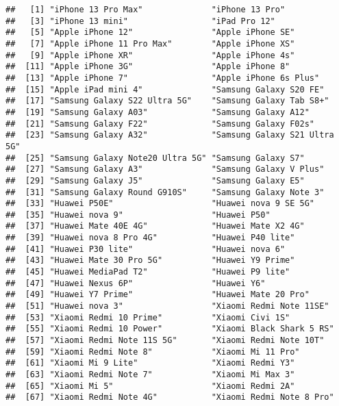 \documentclass[
]{article}
\begin{document}
\begin{verbatim}
##   [1] "iPhone 13 Pro Max"              "iPhone 13 Pro"                 
##   [3] "iPhone 13 mini"                 "iPad Pro 12"                   
##   [5] "Apple iPhone 12"                "Apple iPhone SE"               
##   [7] "Apple iPhone 11 Pro Max"        "Apple iPhone XS"               
##   [9] "Apple iPhone XR"                "Apple iPhone 4s"               
##  [11] "Apple iPhone 3G"                "Apple iPhone 8"                
##  [13] "Apple iPhone 7"                 "Apple iPhone 6s Plus"          
##  [15] "Apple iPad mini 4"              "Samsung Galaxy S20 FE"         
##  [17] "Samsung Galaxy S22 Ultra 5G"    "Samsung Galaxy Tab S8+"        
##  [19] "Samsung Galaxy A03"             "Samsung Galaxy A12"            
##  [21] "Samsung Galaxy F22"             "Samsung Galaxy F02s"           
##  [23] "Samsung Galaxy A32"             "Samsung Galaxy S21 Ultra 5G"   
##  [25] "Samsung Galaxy Note20 Ultra 5G" "Samsung Galaxy S7"             
##  [27] "Samsung Galaxy A3"              "Samsung Galaxy V Plus"         
##  [29] "Samsung Galaxy J5"              "Samsung Galaxy E5"             
##  [31] "Samsung Galaxy Round G910S"     "Samsung Galaxy Note 3"         
##  [33] "Huawei P50E"                    "Huawei nova 9 SE 5G"           
##  [35] "Huawei nova 9"                  "Huawei P50"                    
##  [37] "Huawei Mate 40E 4G"             "Huawei Mate X2 4G"             
##  [39] "Huawei nova 8 Pro 4G"           "Huawei P40 lite"               
##  [41] "Huawei P30 lite"                "Huawei nova 6"                 
##  [43] "Huawei Mate 30 Pro 5G"          "Huawei Y9 Prime"               
##  [45] "Huawei MediaPad T2"             "Huawei P9 lite"                
##  [47] "Huawei Nexus 6P"                "Huawei Y6"                     
##  [49] "Huawei Y7 Prime"                "Huawei Mate 20 Pro"            
##  [51] "Huawei nova 3"                  "Xiaomi Redmi Note 11SE"        
##  [53] "Xiaomi Redmi 10 Prime"          "Xiaomi Civi 1S"                
##  [55] "Xiaomi Redmi 10 Power"          "Xiaomi Black Shark 5 RS"       
##  [57] "Xiaomi Redmi Note 11S 5G"       "Xiaomi Redmi Note 10T"         
##  [59] "Xiaomi Redmi Note 8"            "Xiaomi Mi 11 Pro"              
##  [61] "Xiaomi Mi 9 Lite"               "Xiaomi Redmi Y3"               
##  [63] "Xiaomi Redmi Note 7"            "Xiaomi Mi Max 3"               
##  [65] "Xiaomi Mi 5"                    "Xiaomi Redmi 2A"               
##  [67] "Xiaomi Redmi Note 4G"           "Xiaomi Redmi Note 8 Pro"       

\end{verbatim}
\end{document}
